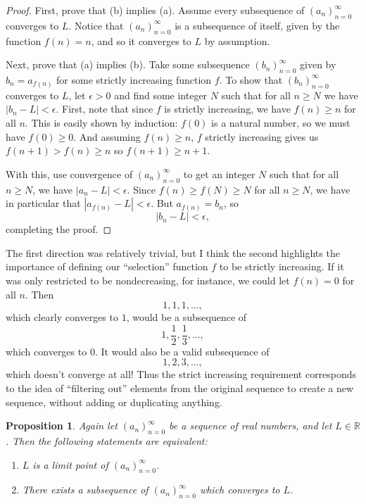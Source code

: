 \documentclass[11pt, oneside]{article}
\newcommand{\R}{\mathbb{R}}
\newtheorem{prop}{Proposition}
\theoremstyle{definition}
\begin{document}
\begin{proof}
    First, prove that (b) implies (a).
    Assume every subsequence of $(a_n)_{n=0}^\infty$ converges to $L$.
    Notice that $(a_n)_{n=0}^\infty$ is a subsequence of itself, given by the function $f(n) = n$, and so it converges to $L$ by assumption.
    
    Next, prove that (a) implies (b). 
    Take some subsequence $(b_n)_{n=0}^\infty$ given by $b_n = a_{f(n)}$ for some strictly increasing function $f$.
    To show that $(b_n)_{n=0}^\infty$ converges to $L$, let $\epsilon > 0$ and find some integer $N$ such that for all $n \geq N$ we have $|b_n - L| < \epsilon$.
    First, note that since $f$ is strictly increasing, we have $f(n) \geq n$ for all $n$. This is easily shown by induction:
    $f(0)$ is a natural number, so we must have $f(0) \geq 0$.
    And assuming $f(n) \geq n$, $f$ strictly increasing gives us $f(n + 1) > f(n) \geq n$ so $f(n + 1) \geq n + 1$.

    With this, use convergence of $(a_n)_{n=0}^\infty$ to get an integer $N$ such that for all $n \geq N$, we have
    $| a_n - L | < \epsilon$.
    Since $f(n) \geq f(N) \geq N$ for all $n \geq N$, we have in particular that $| a_{f(n)} - L | < \epsilon$. But $a_{f(n)} = b_n$, so
    $$| b_n - L| < \epsilon,$$
    completing the proof. 
\end{proof}

The first direction was relatively trivial, but I think the second highlights
the importance of defining our ``selection'' function $f$ to be strictly increasing. If it was
only restricted to be nondecreasing, for instance, we could let $f(n) = 0$ for all $n$. Then 
$$1, 1, 1, ...,$$
which clearly converges to $1$, would be a subsequence of
$$1, \frac{1}{2}, \frac{1}{3}, ...,$$
which converges to $0$. It would also be a valid subsequence of
$$1, 2, 3, ...,$$
which doesn't converge at all! Thus the strict increasing requirement corresponds to the idea of
``filtering out'' elements from the original sequence to create a new sequence, without
adding or duplicating anything.


\begin{prop}\label{subseqconvtolimpt}
    Again let $(a_n)_{n=0}^\infty$ be a sequence of real numbers, and let $L \in \R$. Then the
    following statements are equivalent:
    \begin{enumerate}[label=\emph{(\alph*)}]
        \item $L$ is a limit point of $(a_n)_{n=0}^\infty$.
        \item There exists a subsequence of $(a_n)_{n=0}^\infty$ which converges to $L$.
    \end{enumerate}
\end{prop}
\end{document}
